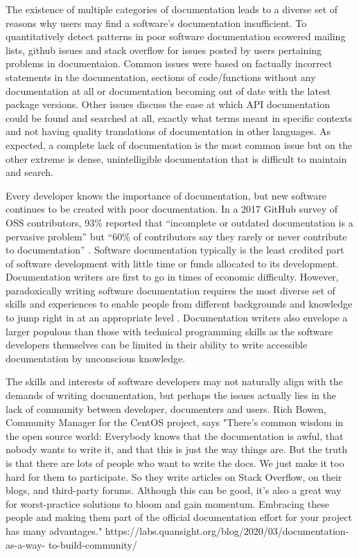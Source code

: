 \documentclass{SBCbookchapter}
\begin{document}
The existence of multiple categories of documentation leads to a diverse set of reasons why users may find a software’s documentation insufficient.
To quantitatively detect patterns in poor software documentation \cite{Aghajani2019} scowered mailing lists, github issues and stack overflow for issues posted by users pertaining problems in documentaion. 
Common issues were based on factually incorrect statements in the documentation, sections of code/functions without any documentation at all or documentation becoming out of date with the latest package versions.
Other issues discuss the ease at which API documentation could be found and searched at all, exactly what terms meant in specific contexts and not having quality translations of documentation in other languages.
As expected, a complete lack of documentation is the most common issue but on the other extreme is dense, unintelligible documentation that is difficult to maintain and search.

Every developer knows the importance of documentation, but new software continues to be created with poor documentation.
In a 2017 GitHub survey of OSS contributors, 93\% reported that “incomplete or outdated documentation is a pervasive problem” but “60\% of contributors say they rarely or never contribute to documentation” \cite{Geiger2017}.
Software documentation typically is the least credited part of software development with little time or funds allocated to its development.
Documentation writers are first to go in times of economic difficulty. \cite{Forward2002}
However, paradoxically writing software documentation requires the most diverse set of skills and experiences to enable people from different backgrounds and knowledge to jump right in at an appropriate level \cite{Geiger2018}.
Documentation writers also envelope a larger populous than those with technical programming skills as the software developers themselves can be limited in their ability to write accessible documentation by unconscious knowledge.

The skills and interests of software developers may not naturally align with the demands of writing documentation, but perhaps the issues actually lies in the lack of community between developer, documenters and users.
Rich Bowen, Community Manager for the CentOS project,  says "There’s common wisdom in the open source world: Everybody knows that the documentation is awful, that nobody wants to write it, and that this is just the way things are. But the truth is that there are lots of people who want to write the docs. We just make it too hard for them to participate. So they write articles on Stack Overflow, on their blogs, and third-party forums. Although this can be good, it’s also a great way for worst-practice solutions to bloom and gain momentum. Embracing these people and making them part of the official documentation effort for your project has many advantages." https://labs.quansight.org/blog/2020/03/documentation-as-a-way- to-build-community/
\end{document}
